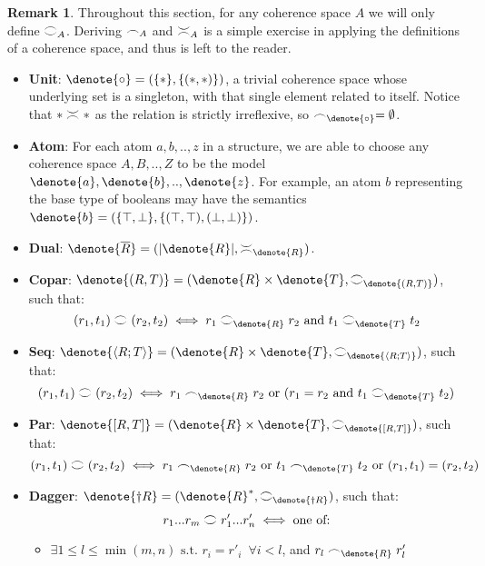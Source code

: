 \documentclass[11pt, oneside]{article}
\theoremstyle{plain}
\theoremstyle{definition}
\newtheorem*{remark}{Remark}
\let\originaldagger\dagger
\renewcommand{\dag}{\mathord{\originaldagger}}
\DeclarePairedDelimiter\denote\llbracket\rrbracket
\newcommand{\la}{\langle}
\newcommand{\ra}{\rangle}
\newcommand{\coh}[1][]{\mathrel{\vcenter{\offinterlineskip\hbox{$\frown$}\vskip0.2ex\hbox{$\smile$}}_{\ifx\\#1\\\else#1\fi}}}
\newcommand{\incoh}[1][]{\mathrel{\vcenter{\offinterlineskip\hbox{$\smile$}\vskip0.2ex\hbox{$\frown$}}_{\ifx\\#1\\\else#1\fi}}}
\newcommand{\scoh}[1][]{\mathrel{\frown}_{\ifx\\#1\\\else#1\fi}}
\newcommand{\unit}{\circ}
\begin{document}
\begin{remark}
    Throughout this section, for any coherence space $A$ we will only define $\coh[A]$.
    Deriving $\scoh[A]$ and $\incoh[A]$ is a simple exercise in applying the definitions of a coherence space, and thus is left to the reader.
\end{remark}

\begin{itemize}

\item
\textbf{Unit}: $\denote{\unit} = (\{*\},\{(*,*)\})$, a trivial coherence space whose underlying set is a singleton, with that single element related to itself.
Notice that $* \incoh[] *$ as the relation is strictly irreflexive, so $\scoh[\denote{\unit}]=\emptyset$.

\item
\textbf{Atom}: For each atom $a,b,..,z$ in a structure, we are able to choose any coherence space $A,B,..,Z$ to be the model $\denote{a},\denote{b},..,\denote{z}$.
For example, an atom $b$ representing the base type of booleans may have the semantics $\denote{b} = (\{\top,\bot\},\{(\top,\top),(\bot,\bot)\})$.

\item
\textbf{Dual}: $\denote{\overline{R}}=(|\denote{R}|,\incoh[\denote{R}])$.

\item
\textbf{Copar}: $\denote{(R,T)} = (\denote{R}\times\denote{T},\coh[\denote{(R,T)}])$,
such that:
$$(r_1,t_1)\coh(r_2,t_2)\iff r_1\coh[\denote{R}]r_2 \text{ and } t_1\coh[\denote{T}]t_2$$

\item
\textbf{Seq}: $\denote{\la R;T\ra} = (\denote{R}\times\denote{T},\coh[\denote{\la R;T\ra}])$, such that:
$$(r_1,t_1)\coh(r_2,t_2) \iff r_1\scoh[\denote{R}]r_2 \text{ or } (r_1 = r_2 \text{ and } t_1\coh[\denote{T}]t_2)$$

\item
\textbf{Par}: $\denote{[R,T]} = (\denote{R}\times\denote{T},\coh[\denote{[R,T]}])$, such that:
$$(r_1,t_1)\coh(r_2,t_2) \iff r_1\scoh[\denote{R}]r_2 \text{ or } t_1\scoh[\denote{T}]t_2 \text{ or } (r_1,t_1)=(r_2,t_2)$$

\item
\textbf{Dagger}: $\denote{\dag R} = (\denote{R}^*, \coh[\denote{\dag R}])$, such that:
$$r_1...r_m \coh r'_1...r'_n \iff \text{one of:}$$

\begin{itemize}
    \item
    $\exists 1\leq l \leq \min(m,n) \text{ s.t. } r_i=r'_i \enspace\forall i<l$, and $r_l \scoh[\denote{R}] r'_l$


\end{itemize}
\end{itemize}
\end{document}
